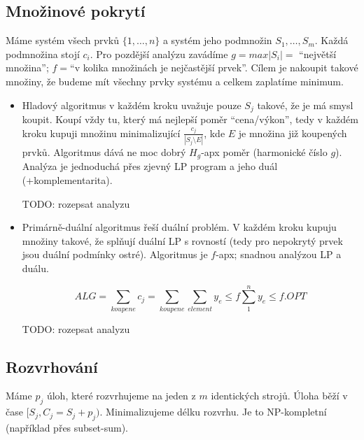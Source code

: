 \documentclass[a4paper,10pt,titlepage]{article} \usepackage[utf8]{inputenc}
\begin{document}
\subsection{Množinové pokrytí}
Máme systém všech prvků $\{1, \ldots, n\}$ a systém jeho podmnožin $S_1, \ldots,
S_m$. Každá podmnožina stojí $c_i$. Pro pozdější analýzu zavádíme $g=max|S_i|=$
``největší množina''; $f=$``v kolika množinách je nejčastější prvek''. Cílem je
nakoupit takové množiny, že budeme mít všechny prvky systému a celkem zaplatíme
minimum.

\begin{itemize}
\item	Hladový algoritmus v každém kroku uvažuje pouze $S_j$ takové, že je má smysl koupit.
	Koupí vždy tu, který má nejlepší poměr ``cena/výkon'', tedy v každém kroku kupuji
	množinu minimalizující $\frac{c_j}{|S_j \setminus E|}$, kde $E$ je množina již koupených
	prvků. Algoritmus dává ne moc dobrý $H_g$-apx poměr (harmonické číslo $g$).
	Analýza je jednoduchá přes zjevný LP program a jeho duál (+komplementarita).

	TODO: rozepsat analyzu

\item	Primárně-duální algoritmus řeší duální problém. V každém kroku kupuju množiny takové,
	že splňují duální LP s rovností (tedy pro nepokrytý prvek jsou duální podmínky
	ostré). Algoritmus je $f$-apx; snadnou analýzou LP a duálu.

	$$
	ALG = \sum\limits_{koupene} c_j = \sum\limits_{koupene}\sum\limits_{element} y_e \leq f \sum\limits_{1}^{n} y_e \leq f.OPT
	$$

	TODO: rozepsat analyzu
\end{itemize}

\subsection{Rozvrhování}
Máme $p_j$ úloh, které rozvrhujeme na jeden z $m$ identických strojů.
Úloha běží v čase $[S_j, C_j=S_j+p_j)$. Minimalizujeme délku rozvrhu.
Je to NP-kompletní (například přes subset-sum).
\end{document}

